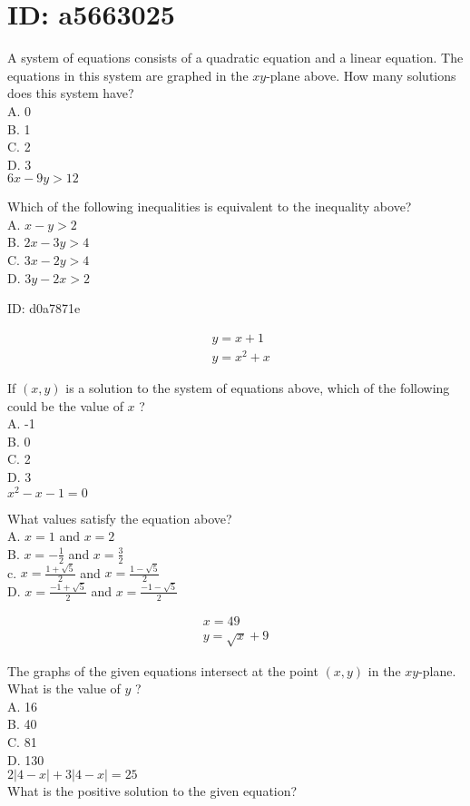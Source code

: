 
\section*{ID: a5663025}


A system of equations consists of a quadratic equation and a linear equation. The equations in this system are graphed in the $x y$-plane above. How many solutions does this system have?\\
A. 0\\
B. 1\\
C. 2\\
D. 3\\
$6 x-9 y>12$

Which of the following inequalities is equivalent to the inequality above?\\
A. $x-y>2$\\
B. $2 x-3 y>4$\\
C. $3 x-2 y>4$\\
D. $3 y-2 x>2$

ID: d0a7871e

$$
\begin{aligned}
& y=x+1 \\
& y=x^{2}+x
\end{aligned}
$$

If $(x, y)$ is a solution to the system of equations above, which of the following could be the value of $x$ ?\\
A. -1\\
B. 0\\
C. 2\\
D. 3\\
$x^{2}-x-1=0$

What values satisfy the equation above?\\
A. $x=1$ and $x=2$\\
B. $x=-\frac{1}{2}$ and $x=\frac{3}{2}$\\
c. $x=\frac{1+\sqrt{5}}{2}$ and $x=\frac{1-\sqrt{5}}{2}$\\
D. $x=\frac{-1+\sqrt{5}}{2}$ and $x=\frac{-1-\sqrt{5}}{2}$

$$
\begin{gathered}
x=49 \\
y=\sqrt{x}+9
\end{gathered}
$$

The graphs of the given equations intersect at the point $(x, y)$ in the $x y$-plane. What is the value of $y$ ?\\
A. 16\\
B. 40\\
C. 81\\
D. 130\\
$2|4-x|+3|4-x|=25$\\
What is the positive solution to the given equation?

